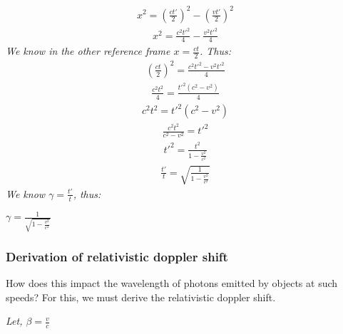 \documentclass{article}
\begin{document}
\begin{gather*}
	x^2 =  \left(\frac{ct'}{2}\right)^2 - \left(\frac{vt'}{2}\right)^2
\end{gather*}
\begin{gather*}
x^2 = \frac{c^2{t'}^2}{4} - \frac{v^2{t'}^2}{4}
\end{gather*}
\textit{We know in the other reference frame $x = \frac{ct}{2}$. Thus:}
\begin{gather*}
	\left(\frac{ct}{2}\right)^2 = \frac{c^2{t'}^2 - v^2{t'}^2}{4} 
\end{gather*}
\begin{gather*}
	\frac{c^2t^2}{4} = \frac{{t'}^2(c^2 - v^2)}{4} 
\end{gather*}
\begin{gather*}
	c^2t^2 = {t'}^2(c^2-v^2)
\end{gather*}
\begin{gather*}
	\frac{c^2t^2}{c^2 - v^2} = {t'}^2
\end{gather*}
\begin{gather*}
	{t'}^2 = \frac{t^2}{1 - \frac{v^2}{c^2}}
\end{gather*}
\begin{gather*}
\frac{{t'}}{t} = \sqrt{\frac{1}{1 - \frac{v^2}{c^2}}}
\end{gather*}
\textit{We know $\gamma = \frac{t'}{t}$, thus:}
\begin{center}
	$\boxed{ \gamma = {\frac{1}{\sqrt{1 - \frac{v^2}{c^2}}}}}
	$
\end{center}

\subsubsection{Derivation of relativistic doppler shift}


How does this impact the wavelength of photons emitted by objects at such speeds? For this, we must derive the relativistic doppler shift. 

\textit{Let, $\beta = \frac{v}{c}$}
\end{document}
